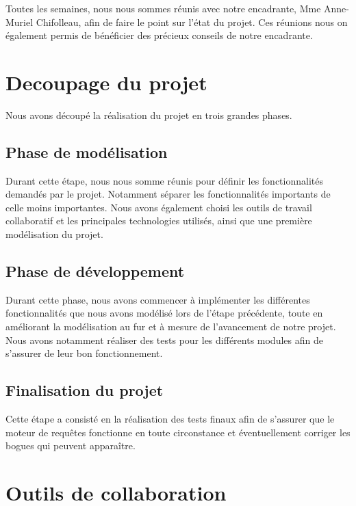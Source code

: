 \documentclass[oneside,13pt,a4paper]{report}
\begin{document}
            Toutes les semaines, nous nous sommes réunis avec notre encadrante, Mme Anne-Muriel Chifolleau, afin de faire le point sur l’état du projet. Ces réunions nous on également permis de bénéficier des précieux conseils de notre encadrante.

        \section{Decoupage du projet}

            Nous avons découpé la réalisation du projet en trois grandes phases.

            \subsection{Phase de modélisation}

                Durant cette étape, nous nous somme réunis pour définir les fonctionnalités demandés par le projet. Notamment séparer les fonctionnalités importants de celle moins importantes. Nous avons également choisi les outils de travail collaboratif et les principales technologies utilisés, ainsi que une première modélisation du projet.

            \subsection{Phase de développement}

                Durant cette phase, nous avons commencer à implémenter les différentes fonctionnalités que nous avons modélisé lors de l’étape précédente, toute en améliorant la modélisation au fur et à mesure de l’avancement de notre projet. Nous avons notamment réaliser des tests pour les différents modules afin de s’assurer de leur bon fonctionnement.

            \subsection{Finalisation du projet}

                Cette étape a consisté en la réalisation des tests finaux afin de s’assurer que le moteur de requêtes fonctionne en toute circonstance et éventuellement corriger les bogues qui peuvent apparaître.

        \section{Outils de collaboration}
\end{document}
